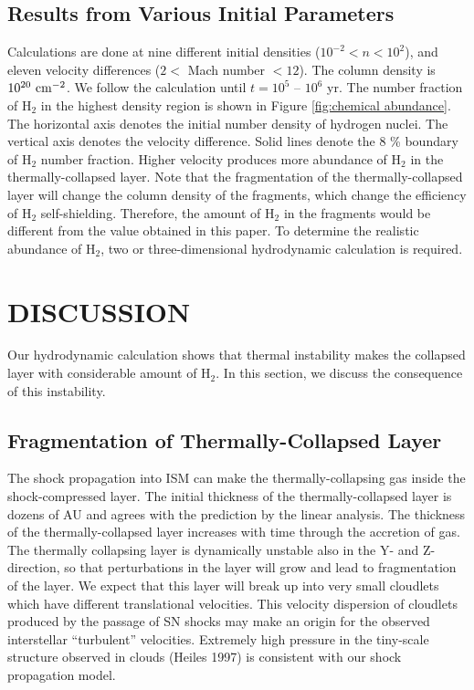 \subsection{Results from Various Initial Parameters}

Calculations are done 
at nine different initial densities ($10^{-2}<n<10^2$),
and eleven velocity differences ($2<$ Mach number $<12$). 
The column density is $10^{20} \ {\rm cm^{-2}}$. 
We follow the calculation until $t=10^5$ -- $10^6$ yr.
The number fraction of H$_2$ in the highest density region
is shown in Figure \ref{fig:chemical abundance}. 
The horizontal axis denotes the initial number density of hydrogen nuclei.
The vertical axis denotes the velocity difference.
Solid lines denote the 8 \% boundary of H$_2$ number fraction.  
Higher velocity produces more abundance of H$_2$ 
in the thermally-collapsed layer.  
Note that the fragmentation of the thermally-collapsed layer will change
the column density of the fragments, which change the efficiency of 
H$_2$ self-shielding.
Therefore, the amount of H$_2$ in the fragments
would be different from the value obtained in this paper.
To determine the realistic abundance of H$_2$,
two or three-dimensional hydrodynamic calculation is required. 



\section{DISCUSSION}

Our hydrodynamic calculation shows that thermal instability makes the
collapsed layer with considerable amount of H$_2$.
In this section, we discuss the consequence of this instability.

\subsection{Fragmentation of Thermally-Collapsed Layer}

The shock propagation into ISM can make the thermally-collapsing gas
inside the shock-compressed layer.
The initial thickness of the thermally-collapsed layer is 
dozens of AU and agrees with the prediction by the linear analysis. 
The thickness of the thermally-collapsed layer increases with time
through the accretion of gas.
The thermally collapsing layer is dynamically unstable
also in the Y- and Z-direction, so that perturbations 
in the layer will grow and lead to fragmentation of the layer.
We expect that this layer will break up into very small cloudlets
which have different translational velocities.
This velocity dispersion of cloudlets produced by the passage of SN shocks
may make an origin for the observed interstellar ``turbulent'' 
velocities.
Extremely high pressure in the tiny-scale structure observed in
 clouds (Heiles 1997) is consistent with our shock propagation
model.

